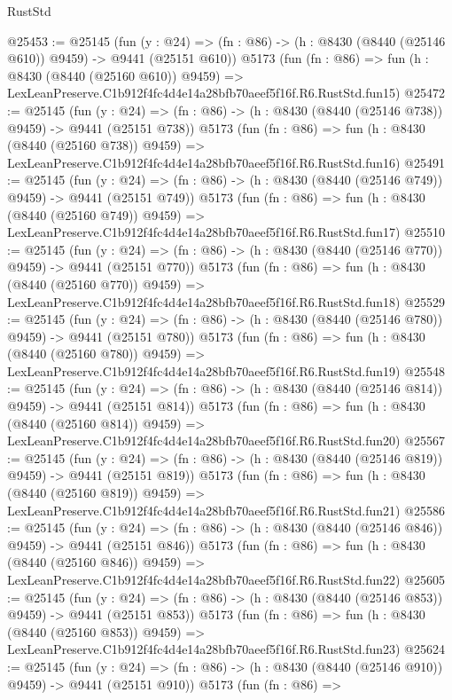 \begin{lexlean}{RustStd}
\begin{coremodule}
@25453 := @25145
    (fun (y : @24) => (fn : @86) -> (h : @8430 (@8440 (@25146 @610)) @9459) -> @9441 (@25151 @610))
    @5173
    (fun (fn : @86) =>
    fun (h : @8430 (@8440 (@25160 @610)) @9459) =>
    LexLeanPreserve.C1b912f4fc4d4e14a28bfb70aeef5f16f.R6.RustStd.fun15)
@25472 := @25145
    (fun (y : @24) => (fn : @86) -> (h : @8430 (@8440 (@25146 @738)) @9459) -> @9441 (@25151 @738))
    @5173
    (fun (fn : @86) =>
    fun (h : @8430 (@8440 (@25160 @738)) @9459) =>
    LexLeanPreserve.C1b912f4fc4d4e14a28bfb70aeef5f16f.R6.RustStd.fun16)
@25491 := @25145
    (fun (y : @24) => (fn : @86) -> (h : @8430 (@8440 (@25146 @749)) @9459) -> @9441 (@25151 @749))
    @5173
    (fun (fn : @86) =>
    fun (h : @8430 (@8440 (@25160 @749)) @9459) =>
    LexLeanPreserve.C1b912f4fc4d4e14a28bfb70aeef5f16f.R6.RustStd.fun17)
@25510 := @25145
    (fun (y : @24) => (fn : @86) -> (h : @8430 (@8440 (@25146 @770)) @9459) -> @9441 (@25151 @770))
    @5173
    (fun (fn : @86) =>
    fun (h : @8430 (@8440 (@25160 @770)) @9459) =>
    LexLeanPreserve.C1b912f4fc4d4e14a28bfb70aeef5f16f.R6.RustStd.fun18)
@25529 := @25145
    (fun (y : @24) => (fn : @86) -> (h : @8430 (@8440 (@25146 @780)) @9459) -> @9441 (@25151 @780))
    @5173
    (fun (fn : @86) =>
    fun (h : @8430 (@8440 (@25160 @780)) @9459) =>
    LexLeanPreserve.C1b912f4fc4d4e14a28bfb70aeef5f16f.R6.RustStd.fun19)
@25548 := @25145
    (fun (y : @24) => (fn : @86) -> (h : @8430 (@8440 (@25146 @814)) @9459) -> @9441 (@25151 @814))
    @5173
    (fun (fn : @86) =>
    fun (h : @8430 (@8440 (@25160 @814)) @9459) =>
    LexLeanPreserve.C1b912f4fc4d4e14a28bfb70aeef5f16f.R6.RustStd.fun20)
@25567 := @25145
    (fun (y : @24) => (fn : @86) -> (h : @8430 (@8440 (@25146 @819)) @9459) -> @9441 (@25151 @819))
    @5173
    (fun (fn : @86) =>
    fun (h : @8430 (@8440 (@25160 @819)) @9459) =>
    LexLeanPreserve.C1b912f4fc4d4e14a28bfb70aeef5f16f.R6.RustStd.fun21)
@25586 := @25145
    (fun (y : @24) => (fn : @86) -> (h : @8430 (@8440 (@25146 @846)) @9459) -> @9441 (@25151 @846))
    @5173
    (fun (fn : @86) =>
    fun (h : @8430 (@8440 (@25160 @846)) @9459) =>
    LexLeanPreserve.C1b912f4fc4d4e14a28bfb70aeef5f16f.R6.RustStd.fun22)
@25605 := @25145
    (fun (y : @24) => (fn : @86) -> (h : @8430 (@8440 (@25146 @853)) @9459) -> @9441 (@25151 @853))
    @5173
    (fun (fn : @86) =>
    fun (h : @8430 (@8440 (@25160 @853)) @9459) =>
    LexLeanPreserve.C1b912f4fc4d4e14a28bfb70aeef5f16f.R6.RustStd.fun23)
@25624 := @25145
    (fun (y : @24) => (fn : @86) -> (h : @8430 (@8440 (@25146 @910)) @9459) -> @9441 (@25151 @910))
    @5173
    (fun (fn : @86) =>

\end{coremodule}
\end{lexlean}
